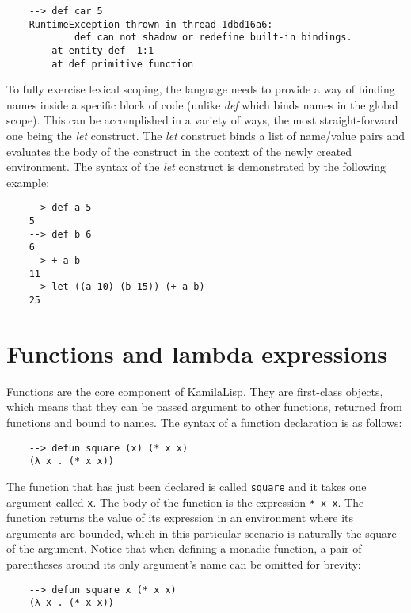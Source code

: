\begin{Verbatim}
    --> def car 5
    RuntimeException thrown in thread 1dbd16a6:
            def can not shadow or redefine built-in bindings.
        at entity def  1:1
        at def primitive function
\end{Verbatim}

To fully exercise lexical scoping, the language needs to provide a way of binding names inside a specific block of code (unlike \textit{def} which binds names in the global scope). This can be accomplished in a variety of ways, the most straight-forward one being the \textit{let} construct. The \textit{let} construct binds a list of name/value pairs and evaluates the body of the construct in the context of the newly created environment. The syntax of the \textit{let} construct is demonstrated by the following example:

\begin{Verbatim}
    --> def a 5
    5
    --> def b 6
    6
    --> + a b
    11
    --> let ((a 10) (b 15)) (+ a b)
    25
\end{Verbatim}

\section{Functions and lambda expressions}

Functions are the core component of KamilaLisp. They are first-class objects, which means that they can be passed argument to other functions, returned from functions and bound to names. The syntax of a function declaration is as follows:

\begin{Verbatim}
    --> defun square (x) (* x x)
    (λ x . (* x x))
\end{Verbatim}

The function that has just been declared is called \verb|square| and it takes one argument called \verb|x|. The body of the function is the expression \verb|* x x|. The function returns the value of its expression in an environment where its arguments are bounded, which in this particular scenario is naturally the square of the argument. Notice that when defining a monadic function, a pair of parentheses around its only argument's name can be omitted for brevity:

\begin{Verbatim}
    --> defun square x (* x x)
    (λ x . (* x x))
\end{Verbatim}

